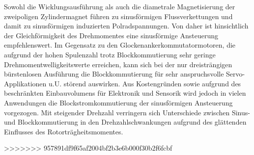 Sowohl die Wicklungsausführung als auch die diametrale Magnetisierung der zweipoligen Zylindermagnet führen zu sinusförmigen Flussverkettungen und damit zu sinusförmigen induzierten Polradspannungen. Von daher ist hinsichtlich der Gleichförmigkeit des Drehmomentes eine sinusförmige Ansteuerung empfehlenswert. Im Gegensatz zu den Glockenankerkommutatormotoren, die aufgrund der hohen Spulenzahl trotz Blockkommutierung sehr geringe Drehmomentwelligkeitswerte erreichen, kann sich bei der nur dreisträngigen bürstenlosen Ausführung die Blockkommutierung für sehr anspruchsvolle Servo-Applikationen u.U. störend auswirken. Aus Kostengründen sowie aufgrund des beschränkten Einbauvolumens für Elektronik und Sensorik wird jedoch in vielen Anwendungen die Blockstromkommutierung der sinusförmigen Ansteuerung vorgezogen. Mit steigender Drehzahl verringern sich Unterschiede zwischen Sinus- und Blockkommutierung in den Drehzahlschwankungen aufgrund des glättenden Einflusses des Rotorträgheitsmomentes. \parencite[S. 78]{Stölting2011}

>>>>>>> 957891df9f65af2004bf2b3e6b000f30b2f6fcbf



